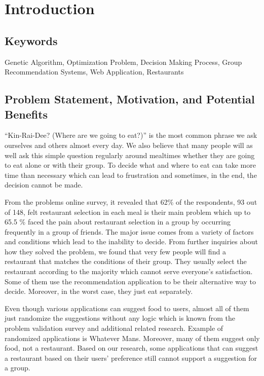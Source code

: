 \documentclass[12pt,oneside,openright,a4paper]{cpe-english-project}
\begin{document}



\chapter{Introduction}

\section{Keywords} 

Genetic Algorithm, Optimization Problem, Decision Making Process, Group Recommendation Systems, Web Application, Restaurants

\section{Problem Statement, Motivation, and Potential Benefits} 

“Kin-Rai-Dee? (Where are we going to eat?)” is the most common phrase we ask ourselves and others almost every day. We also believe that many people will as well ask this simple question regularly around mealtimes whether they are going to eat alone or with their group. To decide what and where to eat can take more time than necessary which can lead to frustration and sometimes, in the end, the decision cannot be made.

From the problems online survey, it revealed that 62\% of the respondents, 93 out of 148, felt restaurant selection in each meal is their main problem which up to 65.5 \% faced the pain about restaurant selection in a group by occurring frequently in a group of friends. The major issue comes from a variety of factors and conditions which lead to the inability to decide. From further inquiries about how they solved the problem, we found that very few people will find a restaurant that matches the conditions of their group. They usually select the restaurant according to the majority which cannot serve everyone’s satisfaction. Some of them use the recommendation application to be their alternative way to decide. Moreover, in the worst case, they just eat separately. 

Even though various applications can suggest food to users, almost all of them just randomize the suggestions without any logic which is known from the problem validation survey and additional related research. Example of randomized applications is Whatever Mans. Moreover, many of them suggest only food, not a restaurant. Based on our research, some applications that can suggest a restaurant based on their users’ preference still cannot support a suggestion for a group.
\end{document}
